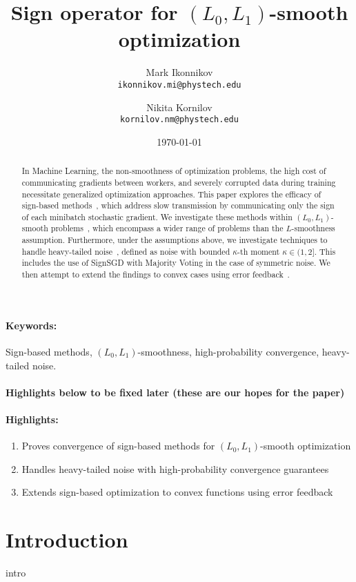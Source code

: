 \documentclass[12pt]{article}
\title{Sign operator for $(L_0, L_1)$-smooth optimization}
\author{
  Mark Ikonnikov\\
  \texttt{ikonnikov.mi@phystech.edu}
  \and
  Nikita Kornilov\\
  \texttt{kornilov.nm@phystech.edu}
}
\date{\today}
\begin{document}
\maketitle


\begin{abstract}
In Machine Learning, the non-smoothness of optimization problems, the high cost of communicating gradients between workers, and severely corrupted data during training necessitate generalized optimization approaches. This paper explores the efficacy of sign-based methods~\cite{pmlr-v80-bernstein18a}, which address slow transmission by communicating only the sign of each minibatch stochastic gradient. We investigate these methods within $(L_0, L_1)$-smooth problems~\cite{gorbunov}, which encompass a wider range of problems than the $L$-smoothness assumption. Furthermore, under the assumptions above, we investigate techniques to handle heavy-tailed noise~\cite{Kornilov2025}, defined as noise with bounded $\kappa$-th moment $\kappa \in (1,2]$. This includes the use of SignSGD with Majority Voting in the case of symmetric noise. We then attempt to extend the findings to convex cases using error feedback~\cite{karimireddy}.
\end{abstract}

\paragraph{Keywords:} Sign-based methods, $(L_0, L_1)$-smoothness, high-probability convergence, heavy-tailed noise.

\paragraph{ Highlights below to be fixed later (these are our hopes for the paper)}

\paragraph{ Highlights:}
\begin{enumerate}
\item Proves convergence of sign-based methods for $(L_0, L_1)$-smooth optimization
\item Handles heavy-tailed noise with high-probability convergence guarantees
\item Extends sign-based optimization to convex functions using error feedback
\end{enumerate}

\section{Introduction}


{intro}


\printbibliography
\end{document}

